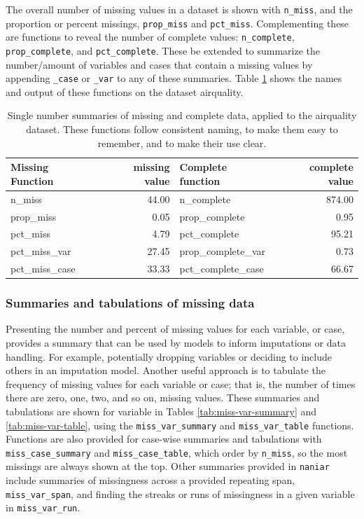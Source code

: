 \documentclass[]{article}
\theoremstyle{definition}
\theoremstyle{definition}
\theoremstyle{definition}
\theoremstyle{remark}
\begin{document}
The overall number of missing values in a dataset is shown with
\texttt{n\_miss}, and the proportion or percent missings,
\texttt{prop\_miss} and \texttt{pct\_miss}. Complementing these are
functions to reveal the number of complete values: \texttt{n\_complete},
\texttt{prop\_complete}, and \texttt{pct\_complete}. These be extended
to summarize the number/amount of variables and cases that contain a
missing values by appending \texttt{\_case} or \texttt{\_var} to any of
these summaries. Table \ref{tab:n-prop-pct-miss-complete} shows the
names and output of these functions on the dataset airquality.

\begin{table}[!h]

\caption{\label{tab:n-prop-pct-miss-complete}Single number summaries of missing and complete data, applied to the airquality dataset. These functions follow consistent naming, to make them easy to remember, and to make their use clear.}
\centering
\begin{tabular}[t]{lrlr}
\toprule
Missing Function & missing value & Complete function & complete value\\
\midrule
n\_miss & 44.00 & n\_complete & 874.00\\
prop\_miss & 0.05 & prop\_complete & 0.95\\
pct\_miss & 4.79 & pct\_complete & 95.21\\
pct\_miss\_var & 27.45 & prop\_complete\_var & 0.73\\
pct\_miss\_case & 33.33 & pct\_complete\_case & 66.67\\
\bottomrule
\end{tabular}
\end{table}

\hypertarget{sum-tab-missings}{%
\subsubsection{Summaries and tabulations of missing
data}\label{sum-tab-missings}}

Presenting the number and percent of missing values for each variable,
or case, provides a summary that can be used by models to inform
imputations or data handling. For example, potentially dropping
variables or deciding to include others in an imputation model. Another
useful approach is to tabulate the frequency of missing values for each
variable or case; that is, the number of times there are zero, one, two,
and so on, missing values. These summaries and tabulations are shown for
variable in Tables \ref{tab:miss-var-summary} and
\ref{tab:miss-var-table}, using the \texttt{miss\_var\_summary} and
\texttt{miss\_var\_table} functions. Functions are also provided for
case-wise summaries and tabulations with \texttt{miss\_case\_summary}
and \texttt{miss\_case\_table}, which order by \texttt{n\_miss}, so the
most missings are always shown at the top. Other summaries provided in
\texttt{naniar} include summaries of missingness across a provided
repeating span, \texttt{miss\_var\_span}, and finding the streaks or
runs of missingness in a given variable in \texttt{miss\_var\_run}.
\end{document}
